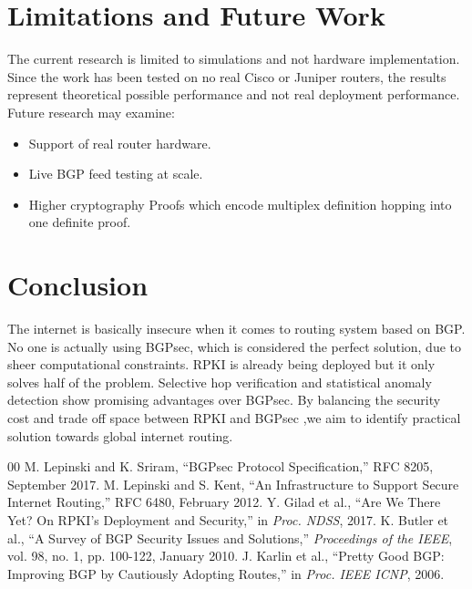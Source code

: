 \documentclass[conference]{IEEEtran}
\begin{document}
\section{Limitations and Future Work}

The current research is limited to simulations and not hardware implementation. Since the work has been tested on no real Cisco or Juniper routers, the results represent theoretical possible performance and not real deployment performance. Future research may examine:

\begin{itemize}
\item Support of real router hardware.
\item Live BGP feed testing at scale.
\item Higher cryptography Proofs which encode multiplex definition hopping into one definite proof.
\end{itemize}

\section{Conclusion}

The internet is basically insecure when it comes to routing system based on BGP. No one is actually using BGPsec, which is considered the perfect solution, due to sheer computational constraints. RPKI is already being deployed but it only solves half of the problem. Selective hop verification and statistical anomaly detection show promising advantages over BGPsec. By balancing the security cost and trade off space between RPKI and BGPsec ,we aim to identify practical solution towards global internet routing.

\begin{thebibliography}{00}
 M. Lepinski and K. Sriram, ``BGPsec Protocol Specification,'' RFC 8205, September 2017.
 M. Lepinski and S. Kent, ``An Infrastructure to Support Secure Internet Routing,'' RFC 6480, February 2012.
 Y. Gilad et al., ``Are We There Yet? On RPKI's Deployment and Security,'' in \textit{Proc. NDSS}, 2017.
 K. Butler et al., ``A Survey of BGP Security Issues and Solutions,'' \textit{Proceedings of the IEEE}, vol. 98, no. 1, pp. 100-122, January 2010.
 J. Karlin et al., ``Pretty Good BGP: Improving BGP by Cautiously Adopting Routes,'' in \textit{Proc. IEEE ICNP}, 2006.
\end{thebibliography}
\end{document}
